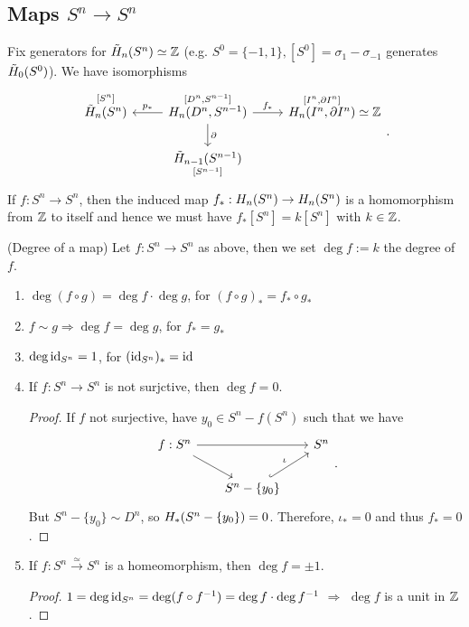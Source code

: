 \documentclass[a4paper,11pt]{article}
\begin{document}
		
		\subsection{Maps $S^n\rightarrow S^n$}
			Fix generators for $\rhg[n]{S^n}\simeq\Z$ (e.g. $S^0=\{-1,1\},[S^0]=\sigma_1-\sigma_{-1}$ generates $\rhg[0]{S^0}$). We have isomorphisms
			\begin{equation*}
				\begin{tikzcd}
					\overset{[S^n]}{\rhg[n]{S^n}}& \overset{[D^n,S^{n-1}]}{\hg[n]{D^n,S^{n-1}}}\ar[d,"\partial"]\ar[l,"p_\ast"']\ar[r,"f_\ast"]& \overset{[I^n,\partial I^n]}{\hg[n]{I^n,\partial I^n}}\simeq\Z\\
					& \underset{[S^{n-1}]}{\rhg[n-1]{S^{n-1}}} &
				\end{tikzcd}.
			\end{equation*}
			If $f:S^n\rightarrow S^n$, then the induced map $f_\ast:\hg[n]{S^n}\rightarrow \hg[n]{S^n}$ is a homomorphism from $\Z$ to itself and hence we must have $f_\ast[S^n]=k[S^n]$ with $k\in\Z$.

			\begin{defi}
				(Degree of a map) Let $f:S^n\rightarrow S^n$ as above, then we set $\deg f:=k$ the degree of $f$.
			\end{defi}

			\begin{enumerate}
				\item $\deg(f\circ g)=\deg f\cdot\deg g$, for $(f\circ g)_\ast=f_\ast\circ g_\ast$
				\item $f\sim g\Longrightarrow \deg f=\deg g$, for $f_\ast=g_\ast$
				\item $\deg\id_{S^n}=1$, for $(\id_{S^n})_\ast=\id$
				\item If $f:S^n\rightarrow S^n$ is not surjctive, then $\deg f=0$.
					\begin{proof}
						If $f$ not surjective, have $y_0\in S^n-f(S^n)$ such that we have
						\begin{equation*}
							\begin{tikzcd}[column sep=scriptsize]
								f:S^n\ar[rd]\ar[rr]& & S^n\\
								& S^n-\{y_0\}\ar[ru,hookrightarrow,"\iota"] &
							\end{tikzcd}.
						\end{equation*}
						But $S^n-\{y_0\}\sim D^n$, so $\hg{S^n-\{y_0\}}=0$. Therefore, $\iota_\ast=0$ and thus $f_\ast=0$. 
					\end{proof}
				
				\item If $f:S^n\overset{\simeq}{\longrightarrow} S^n$ is a homeomorphism, then $\deg f=\pm 1$.
					\begin{proof}
						$1=\deg\id_{S^n}=\deg(f\circ f^{-1})=\deg f\cdot\deg f^{-1}$ $\Longrightarrow$ $\deg f$ is a unit in $\Z$.
					\end{proof}
			\end{enumerate}
\end{document}

